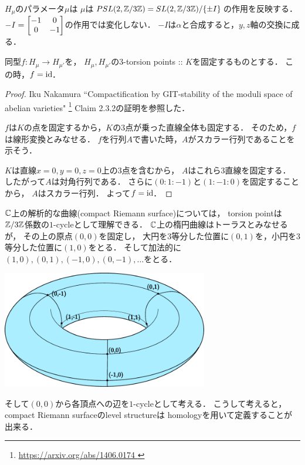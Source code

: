 \documentclass[a4paper]{jsarticle}
\begin{document}
    $H_{\mu}$のパラメータ$\mu$は
    $\mu$は$PSL(2, \mathbb{Z}/3\mathbb{Z})=SL(2, \mathbb{Z}/3\mathbb{Z})/\{\pm I\}$の作用を反映する．
    $-I=\begin{bmatrix}-1 & 0 \\ 0 & -1\end{bmatrix}$の作用では変化しない．
    $-I$は$\alpha$と合成すると，$y,z$軸の交換に成る．

    \begin{Prop}
        同型$f: H_{\mu} \to H_{\mu'}$を，
        $H_{\mu}, H_{\mu'}$の$3$-torsion points :: $K$を固定するものとする．
        この時，$f=\mathrm{id}_{\!}$．
    \end{Prop}
    \begin{proof}
        Iku Nakamura
        ``Compactification by GIT-stability of the moduli space of abelian varieties"
        \footnote{ \url{ https://arxiv.org/abs/1406.0174 } }
        Claim 2.3.2の証明を参照した．

        $f$は$K$の点を固定するから，$K$の$3$点が乗った直線全体も固定する．
        そのため，$f$は線形変換とみなせる．
        $f$を行列$A$で書いた時，$A$がスカラー行列であることを示そう．

        $K$は直線$x=0, y=0, z=0$上の$3$点を含むから，
        $A$はこれら$3$直線を固定する．
        したがって$A$は対角行列である．
        さらに$(0:1:-1)$と$(1:-1:0)$を固定することから，
        $A$はスカラー行列．
        よって$f=\mathrm{id}_{\!}$．
    \end{proof}

    $\mathbb{C}$上の解析的な曲線(compact Riemann surface)については，
    torsion pointは$\mathbb{Z}/3\mathbb{Z}$係数の$1$-cycleとして理解できる．
    $\mathbb{C}$上の楕円曲線はトーラスとみなせるが，
    その上の原点$(0,0)$を固定し，
    大円を$3$等分した位置に$(0,1)$を，小円を$3$等分した位置に$(1,0)$をとる．
    そして加法的に$(1,0), (0,1), (-1,0), (0,-1), \dots$をとる．
    \begin{center}
        \includegraphics[width=9cm,pagebox=cropbox]{./images/torus_with_3_torsions.pdf}
    \end{center}
    そして$(0,0)$から各頂点への辺を$1$-cycleとして考える．
    こうして考えると，
    compact Riemann surfaceのlevel structureは
    homologyを用いて定義することが出来る．
\end{document}
